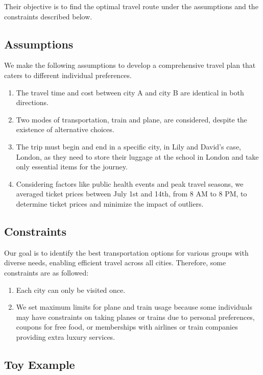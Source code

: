 \documentclass{article} %
\begin{document}
Their objective is to find the optimal travel route under the assumptions and
the constraints described below.

\subsection{Assumptions}

We make the following assumptions to develop a comprehensive travel plan that
caters to different individual preferences.

\begin{enumerate}
  \item The travel time and cost between city A and city B are identical in both
        directions.
  \item Two modes of transportation, train and plane, are considered, despite the
        existence of alternative choices.
  \item The trip must begin and end in a specific city, in Lily and David's case,
        London, as they need to store their luggage at the school in London and take
        only essential items for the journey.
  \item Considering factors like public health events and peak travel seasons, we
        averaged ticket prices between July 1st and 14th, from
        8 AM to 8 PM, to determine ticket prices and minimize the impact of outliers.
\end{enumerate}

\subsection{Constraints}

Our goal is to identify the best transportation options for various groups with
diverse needs, enabling efficient travel across all cities. Therefore, some
constraints are as followed:

\begin{enumerate}
  \item Each city can only be visited once.
  \item We set maximum limits for plane and train usage because some individuals may
        have constraints on taking planes or trains due to personal preferences,
        coupons for free food, or memberships with airlines or train companies
        providing extra luxury services.
\end{enumerate}

\subsection{Toy Example}
\end{document}
